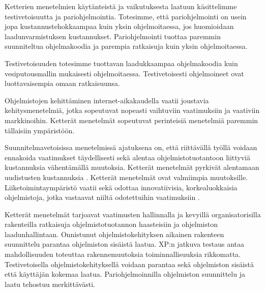 \documentclass[finnish]{tktltiki2}
\theoremstyle{definition}
\theoremstyle{remark}
\begin{document}
Ketterien menetelmien käytänteistä ja vaikutuksesta laatuun käsittelimme testivetoisuutta ja pariohjelmointia. Totesimme, että pariohjelmointi on usein jopa kustannustehokkaampaa kuin yksin ohjelmoitaessa, jos huomioidaan laadunvarmistuksen kustannukset. Pariohjelmointi tuottaa paremmin suunniteltua ohjelmakoodia ja parempia ratkaisuja kuin yksin ohjelmoitaessa. 

Testivetoisuuden totesimme tuottavan laadukkaampaa ohjelmakoodia kuin vesiputousmallin mukaisesti ohjelmoitaessa. Testivetoisesti ohjelmoineet ovat luottavaisempia omaan ratkaisuunsa. 

Ohjelmistojen kehittäminen internet-aikakaudella vaatii joustavia kehitysmenetelmiä, jotka sopeutuvat nopeasti vaihtuviin vaatimuksiin ja vaativiin markkinoihin. Ketterät menetelmät sopeutuvat perinteisiä menetelmiä paremmin tällaisiin ympäristöön.

Suunnitelmavetoisissa menetelmissä ajatuksena on, että riittävällä työllä voidaan ennakoida vaatimukset täydellisesti sekä alentaa ohjelmistotuotantoon liittyviä kustannuksia vähentämällä muutoksia. Ketterät menetelmät pyrkivät alentamaan uudistusten kustannuksia \cite{WIC03}. Ketterät menetelmät ovat valmiimpia muutoksille. Liiketoimintaympäristö vaatii sekä odottaa innovatiivisia, korkealuokkaisia ohjelmistoja, jotka vastaavat niiltä odotettuihin vaatimuksiin \cite{BRL03}.

Ketterät menetelmät tarjoavat vaatimusten hallinnalla ja kevyillä organisatorisilla rakenteilla ratkaisuja ohjelmistotuotannon haasteisiin ja ohjelmiston laadunhallintaan. Onnistunut ohjelmistokehityksen aikainen rakenteen suunnittelu parantaa ohjelmiston sisäistä laatua. XP:n jatkuva testaus antaa mahdollisuuden toteuttaa rakennemuutoksia toiminnallisuuksia rikkomatta. Testivetoisella ohjelmistokehityksellä voidaan parantaa sekä ohjelmiston sisäistä että käyttäjän kokemaa laatua. Pariohjelmoinnilla ohjelmiston suunnittelu ja laatu tehostuu merkittävästi.



%
%
% 
%



\end{document}
